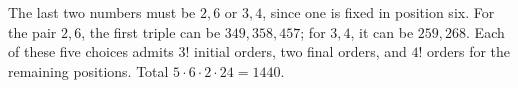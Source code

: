 The last two numbers must be $2,6$ or $3,4$, since one is fixed in position six. For the pair $2,6$, the first triple can be $349,358,457$; for $3,4$, it can be $259,268$. Each of these five choices admits $3!$ initial orders, two final orders, and $4!$ orders for the remaining positions. Total $5\cdot6\cdot2\cdot24=\boxed{1440}$.
